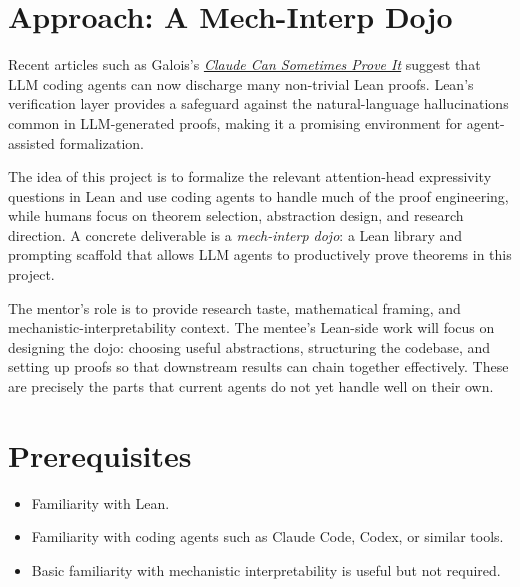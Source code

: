 \documentclass[11pt]{article}
\begin{document}
\section*{Approach: A Mech-Interp Dojo}

Recent articles such as Galois's \href{https://www.galois.com/articles/claude-can-sometimes-prove-it}{\textit{Claude Can Sometimes Prove It}} suggest that LLM coding agents can now discharge many non-trivial Lean proofs. Lean's verification layer provides a safeguard against the natural-language hallucinations common in LLM-generated proofs, making it a promising environment for agent-assisted formalization.

The idea of this project is to formalize the relevant attention-head expressivity questions in Lean and use coding agents to handle much of the proof engineering, while humans focus on theorem selection, abstraction design, and research direction. A concrete deliverable is a \emph{mech-interp dojo}: a Lean library and prompting scaffold that allows LLM agents to productively prove theorems in this project.

The mentor's role is to provide research taste, mathematical framing, and mechanistic-interpretability context. The mentee's Lean-side work will focus on designing the dojo: choosing useful abstractions, structuring the codebase, and setting up proofs so that downstream results can chain together effectively. These are precisely the parts that current agents do not yet handle well on their own.

\section*{Prerequisites}

\begin{itemize}
  \item Familiarity with Lean.
  \item Familiarity with coding agents such as Claude Code, Codex, or similar tools.
  \item Basic familiarity with mechanistic interpretability is useful but not required.
\end{itemize}
\end{document}
